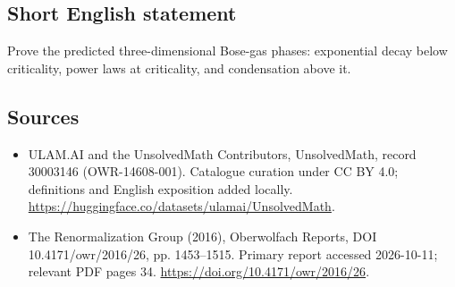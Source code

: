\documentclass[11pt]{article}
\begin{document}
\subsection{Short English statement}
Prove the predicted three-dimensional Bose-gas phases: exponential decay below criticality, power laws at criticality, and condensation above it.
\subsection{Sources}
\begin{itemize}
\item[\hypertarget{source:30003146:1}{S1}] ULAM.AI and the UnsolvedMath Contributors, UnsolvedMath, record 30003146 (OWR-14608-001). Catalogue curation under CC BY 4.0; definitions and English exposition added locally.
\url{https://huggingface.co/datasets/ulamai/UnsolvedMath}.
\item[\hypertarget{source:30003146:2}{S2}] The Renormalization Group (2016), Oberwolfach Reports, DOI 10.4171/owr/2016/26, pp. 1453--1515. Primary report accessed 2026-10-11; relevant PDF pages 34.
\url{https://doi.org/10.4171/owr/2016/26}.
\end{itemize}
\label{end:30003146}
\end{document}
